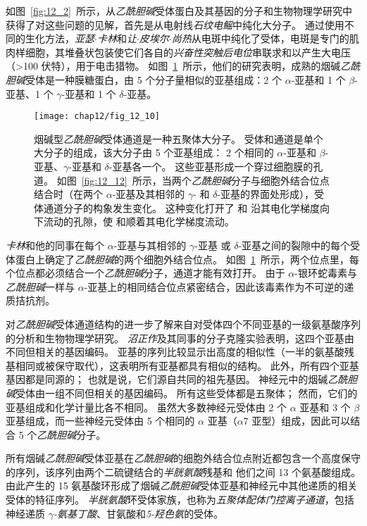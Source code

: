 如图~\ref{fig:12_2}~所示，从\textit{乙酰胆碱}受体蛋白及其基因的分子和生物物理学研究中获得了对这些问题的见解，首先是从电射线\textit{石纹电鳐}中纯化大分子。
通过使用不同的生化方法，\textit{亚瑟$\cdot$卡林}和\textit{让$\cdot$皮埃尔$\cdot$尚热}从电斑中纯化了受体，电斑是专门的肌肉样细胞，其堆叠状包装使它们各自的\textit{兴奋性突触后电位}串联求和以产生大电压（>100 伏特），用于电击猎物。
如图~\ref{fig:12_10}~所示，他们的研究表明，成熟的烟碱\textit{乙酰胆碱}受体是一种膜糖蛋白，由 5 个分子量相似的亚基组成：2 个 $\alpha$-亚基和 1 个 $\beta$-亚基、1 个 $\gamma$-亚基和 1 个 $\delta$-亚基。


\begin{figure}[htbp]
	\centering
	\texttt{[image: chap12/fig\_12\_10]}
	\caption{烟碱型\textit{乙酰胆碱}受体通道是一种五聚体大分子。
		受体和通道是单个大分子的组成，该大分子由 5 个亚基组成：
		2 个相同的 $\alpha$-亚基和 $\beta$-亚基、$\gamma$-亚基和 $\delta$-亚基各一个。
		这些亚基形成一个穿过细胞膜的孔道。
		如图~\ref{fig:12_12}~所示，当两个\textit{乙酰胆碱}分子与细胞外结合位点结合时（在两个 $\alpha$-亚基及其相邻的 $\gamma$- 和 $\delta$-亚基的界面处形成），受体通道分子的构象发生变化。
		这种变化打开了  和  沿其电化学梯度向下流动的孔隙，使  和顺着其电化学梯度流动。}
	\label{fig:12_10}
\end{figure}


\textit{卡林}和他的同事在每个 $\alpha$-亚基与其相邻的 $\gamma$-亚基 或 $\delta$-亚基之间的裂隙中的每个受体蛋白上确定了\textit{乙酰胆碱}的两个细胞外结合位点。
如图~\ref{fig:12_10}~所示，两个位点里，每个位点都必须结合一个\textit{乙酰胆碱}分子，通道才能有效打开。
由于 $\alpha$-银环蛇毒素与\textit{乙酰胆碱}一样与 $\alpha$-亚基上的相同结合位点紧密结合，因此该毒素作为不可逆的递质拮抗剂。


对\textit{乙酰胆碱}受体通道结构的进一步了解来自对受体四个不同亚基的一级氨基酸序列的分析和生物物理学研究。
\textit{沼正作}及其同事的分子克隆实验表明，这四个亚基由不同但相关的基因编码。
亚基的序列比较显示出高度的相似性（一半的氨基酸残基相同或被保守取代），这表明所有亚基都具有相似的结构。 
此外，所有四个亚基基因都是同源的；
也就是说，它们源自共同的祖先基因。
神经元中的烟碱\textit{乙酰胆碱}受体由一组不同但相关的基因编码。
所有这些受体都是五聚体；
然而，它们的亚基组成和化学计量比各不相同。
虽然大多数神经元受体由 2 个 $\alpha$ 亚基和 3 个 $\beta$ 亚基组成，而一些神经元受体由 5 个相同的 $\alpha$ 亚基（$\alpha$7 亚型）组成，因此可以结合 5 个\textit{乙酰胆碱}分子。


所有烟碱\textit{乙酰胆碱}受体亚基在\textit{乙酰胆碱}的细胞外结合位点附近都包含一个高度保守的序列，该序列由两个二硫键结合的\textit{半胱氨酸}残基和 他们之间 13 个氨基酸组成。
由此产生的 15 氨基酸环形成了烟碱\textit{乙酰胆碱}受体亚基和神经元中其他递质的相关受体的特征序列。
\textit{半胱氨酸}环受体家族，也称为\textit{五聚体配体门控离子通道}，包括神经递质 \textit{$\gamma$-氨基丁酸}、甘氨酸和\textit{5-羟色氨}的受体。


